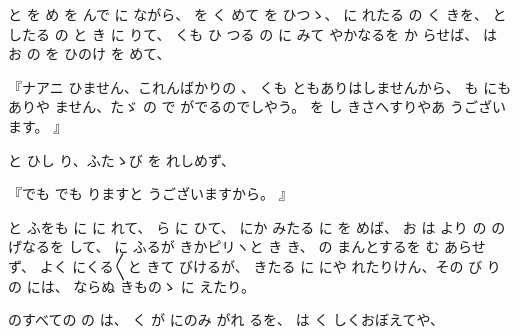 と
を
め
を
んで
に
ながら、
を
く
めて
を
ひつゝ、
に
れたる
の
く
きを、
としたる
の
と
き
に
りて、
くも
ひ
つる
の
に
みて
やかなるを
か
らせば、
は
お
の
を
ひのけ
を
めて、

『ナアニ
ひません、これんばかりの
、
くも
ともありはしませんから、
も
にもありや
ません、たゞ
の
で
がでるのでしやう。
を
し
きさへすりやあ
うございます。
』

と
ひし
り、ふたゝび
を
れしめず、

『でも
でも
りますと
うございますから。
』

と
ふをも
に
に
れて、
ら
に
ひて、
にか
みたる
に
を
めば、
お
は
より
の
の
げなるを
して、
に
ふるが
きかピリヽと
き
き、
の
まんとするを
む
あらせず、
よく
にくる〳〵と
きて
びけるが、
きたる
に
にや
れたりけん、その
び
りの
には、
ならぬ
きものゝ
に
えたり。

のすべての
の
は、
く
が
にのみ
がれ
るを、
は
く
しくおぼえてや、

